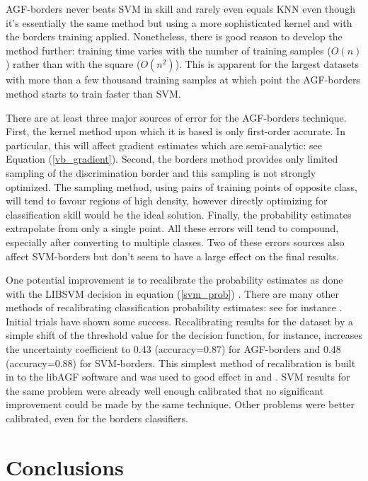 AGF-borders never beats SVM in skill and
rarely even equals KNN even though it's essentially the same method
but using a more sophisticated kernel and with the borders training applied.
Nonetheless, there is good reason to develop the method further: 
training time varies with the number of training samples ($O(n)$) rather than with
the square ($O(n^2)$).
This is apparent for the largest datasets with more than a few thousand training samples
at which point the AGF-borders method starts to train faster than SVM.

There are at least three major sources of error for the AGF-borders technique.
First, the kernel method upon which it is based is only first-order accurate.
In particular, this will affect gradient estimates 
which are semi-analytic: see Equation (\ref{vb_gradient}).
Second, the borders method provides only limited sampling of the discrimination
border and this sampling is not strongly optimized.
The sampling method, using pairs of training points of opposite class, will
tend to favour regions of high density, however  
directly optimizing for classification skill would be the ideal solution.
Finally, the probability estimates extrapolate from only a single point.
All these errors will tend to compound, especially after converting to
multiple classes.
Two of these errors sources also affect SVM-borders but don't seem to have a large
effect on the final results.

One potential improvement is to recalibrate the probability estimates as 
done with the LIBSVM decision in equation (\ref{svm_prob}) \citep{Platt1999,Lin_etal2007}.
There are many other methods of recalibrating classification probability
estimates: see for instance 
\citet{Niculescu-Mizil_Caruana2005,Zadrozny_Elkan2001}.
Initial trials have shown some success.
Recalibrating results for the  dataset by a simple shift of the threshold value
for the decision function, for instance, increases the
uncertainty coefficient to 0.43 (accuracy=0.87) for AGF-borders and 0.48 (accuracy=0.88)
for SVM-borders.
This simplest method of recalibration is built in to the libAGF software
and was used to good effect in \citet{Mills2009} and \citet{Mills2011}.
SVM results for the same problem were already well enough calibrated
that no significant improvement could be made by the same technique.
Other problems were better calibrated, even for the borders classifiers.

\section{Conclusions}


